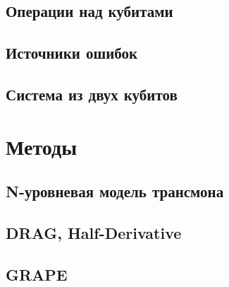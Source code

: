 \documentclass[aspectratio=169, 13pt]{beamer}
\begin{document}
\subsection{Операции над кубитами}
\begin{frame}[c]\frametitle{\secname}\framesubtitle{\subsecname}


\end{frame}


\subsection{Источники ошибок}
\begin{frame}[c]\frametitle{\secname}\framesubtitle{\subsecname}


\end{frame}


\subsection{Система из двух кубитов}
\begin{frame}[c]\frametitle{\secname}\framesubtitle{\subsecname}


\end{frame}


\section{Методы}

\subsection{N-уровневая модель трансмона}
\begin{frame}[c]\frametitle{\secname}\framesubtitle{\subsecname}


\end{frame}

\subsection{DRAG, Half-Derivative}
\begin{frame}[c]\frametitle{\secname}\framesubtitle{\subsecname}


\end{frame}

\subsection{GRAPE}
\begin{frame}[c]\frametitle{\secname}\framesubtitle{\subsecname}


\end{frame}
\end{document}
